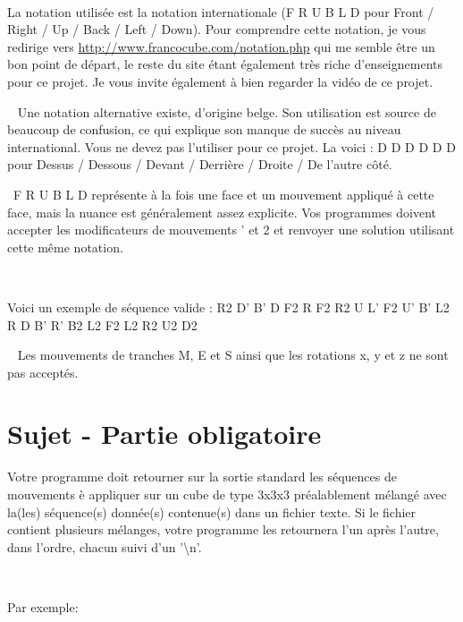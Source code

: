 \documentclass{42}
\begin{document}
\

La notation utilis\'ee est la notation internationale (F R U B L D pour Front / Right / Up / Back / Left / Down). Pour comprendre cette notation, je vous redirige vers \url{http://www.francocube.com/notation.php} qui me semble \^etre un bon point de d\'epart, le reste du site \'etant \'egalement tr\`es riche d'enseignements pour ce projet. Je vous invite \'egalement \`a bien regarder la vid\'eo de ce projet.

\
\hint
{
Une notation alternative existe, d'origine belge. Son utilisation est source de beaucoup de confusion, ce qui explique son manque de succ\`es au niveau international. Vous ne devez pas l'utiliser pour ce projet. La voici :
D D D D D D pour Dessus / Dessous / Devant / Derri\`ere / Droite / De l'autre c\^ot\'e.
}

\
F R U B L D repr\'esente \`a la fois une face et un mouvement appliqu\'e \`a cette face, mais la nuance est g\'en\'eralement assez explicite. Vos programmes doivent accepter les modificateurs de mouvements ' et 2 et renvoyer une solution utilisant cette m\^eme notation.

\

Voici un exemple de s\'equence valide :
R2 D' B' D F2 R F2 R2 U L' F2 U' B' L2 R D B' R' B2 L2 F2 L2 R2 U2 D2

\
\warn
{
Les mouvements de tranches M, E et S ainsi que les rotations x, y et z ne sont pas accept\'es.
}

\newpage
%
%

\chapter{Sujet - Partie obligatoire}

Votre programme doit retourner sur la sortie standard les s\'equences de mouvements \`e appliquer sur un cube de type 3x3x3 pr\'ealablement m\'elang\'e avec la(les) s\'equence(s) donn\'ee(s) contenue(s) dans un fichier texte. Si le fichier contient plusieurs m\'elanges, votre programme les retournera l'un apr\`es l'autre, dans l'ordre, chacun suivi d'un '\textbackslash n'.

\

Par exemple:
\end{document}
